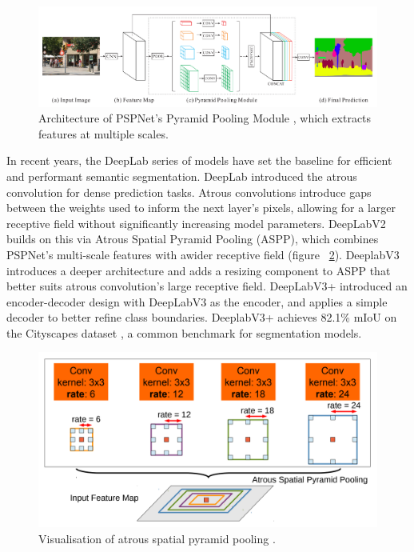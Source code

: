 \documentclass[a4paper,12pt]{report}
\begin{document}
    \begin{figure}[hb]
        \centering
        \includegraphics[width=\textwidth]{res/pspnet-architecture.png}
        \caption{Architecture of PSPNet's Pyramid Pooling Module \cite{zhao_pyramid_2017}, which extracts features at multiple scales.}
        \label{fig:pspnet_architecture}
    \end{figure}

    In recent years, the DeepLab series of models have set the baseline for efficient and performant semantic segmentation. DeepLab \cite{chen_semantic_2016} introduced the atrous convolution for dense prediction tasks. Atrous convolutions introduce gaps between the weights used to inform the next layer’s pixels, allowing for a larger receptive field without significantly increasing model parameters. DeepLabV2 \cite{chen_deeplab_2017} builds on this via Atrous Spatial Pyramid Pooling (ASPP), which combines PSPNet’s \cite{zhao_pyramid_2017} multi-scale features with awider receptive field (figure ~\ref{fig:deeplab_aspp}). DeeplabV3 \cite{chen_rethinking_2017} introduces a deeper architecture and adds a resizing component to ASPP that better suits atrous convolution’s large receptive field. DeepLabV3+ \cite{chen_encoder-decoder_2018} introduced an encoder-decoder design with DeepLabV3 as the encoder, and applies a simple decoder to better refine class boundaries. DeeplabV3+ achieves 82.1\% mIoU on the Cityscapes dataset \cite{cordts_cityscapes_2016}, a common benchmark for segmentation models.
    
    \begin{figure}[t]
        \centering
        \includegraphics[scale=0.5]{res/deeplab-aspp.png}
        \caption{Visualisation of atrous spatial pyramid pooling \cite{chen_deeplab_2017}.}
        \label{fig:deeplab_aspp}
    \end{figure}
    
\end{document}
